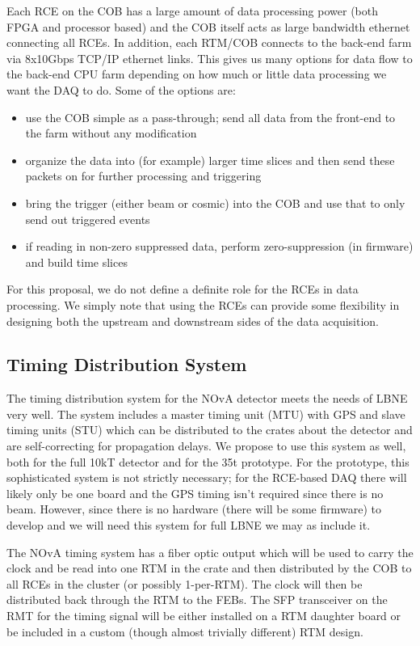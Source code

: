 Each RCE on the COB has a large amount of data processing power (both FPGA and processor based) and the COB itself acts as large bandwidth ethernet connecting all RCEs.  In addition, each RTM/COB connects to the back-end farm via 8x10Gbps TCP/IP ethernet links.  This gives us many options for data flow to the back-end CPU farm depending on how much or little data processing we want the DAQ to do.  Some of the options are:
\begin{itemize}
\item use the COB simple as a pass-through; send all data from the front-end to the farm without any modification
\item organize the data into (for example) larger time slices and then send these packets on for further processing and triggering
\item bring the trigger (either beam or cosmic) into the COB and use that to only send out triggered events
\item if reading in non-zero suppressed data, perform zero-suppression (in firmware) and build time slices
\end{itemize}
For this proposal, we do not define a definite role for the RCEs in data processing.  We simply note that using the RCEs can provide some flexibility in designing both the upstream and downstream sides of the data acquisition.  


\subsection{Timing Distribution System}

The timing distribution system for the NOvA detector\cite{Ayres:2007tu} meets the needs of LBNE very well.  The system includes a master timing unit (MTU) with GPS and slave timing units (STU) which can be distributed to the crates about the detector and are self-correcting for propagation delays.  We propose  to use this system as well, both for the full 10kT detector and for the 35t prototype.  For the prototype, this sophisticated system is not strictly necessary; for the RCE-based DAQ there will likely only be one board and the GPS timing isn't required since there is no beam.  However, since there is no hardware (there will be some firmware) to develop and we will need this system for full LBNE we may as include it. 

The NOvA timing system has a fiber optic output which will be used to carry the clock and  be read into one RTM in the crate and then distributed by the COB to all RCEs in the cluster (or possibly 1-per-RTM).  The clock will then be distributed  back through the RTM to the FEBs.   The SFP transceiver on the RMT for the timing signal will be either installed on a RTM daughter board or be included in a custom (though almost trivially different) RTM design.  

